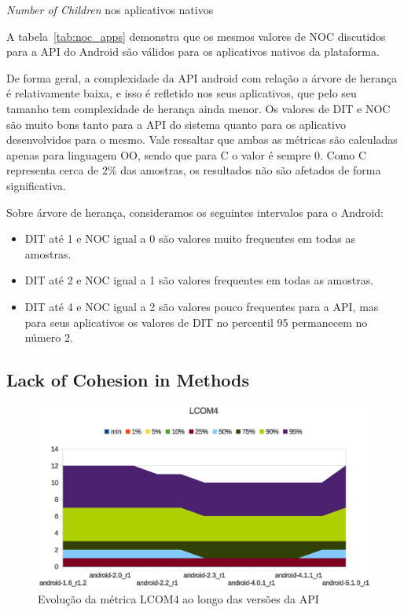 \begin{table}[!htb]
\centering
{}

\caption{\textit{Number of Children} nos aplicativos nativos}
\label{tab:noc_apps}
\end{table}

A tabela~\ref{tab:noc_apps} demonstra que os mesmos valores de NOC discutidos para a API do Android são válidos para os aplicativos nativos da plataforma. 

De forma geral, a complexidade da API android com relação a árvore de herança é relativamente baixa, e isso é refletido nos seus aplicativos, que pelo seu tamanho tem complexidade de herança ainda menor. Os valores de DIT e NOC são muito bons tanto para a API do sistema quanto para os aplicativo desenvolvidos para o mesmo. Vale ressaltar que ambas as métricas são calculadas apenas para linguagem OO, sendo que para C o valor é sempre 0. Como C representa cerca de 2\% das amostras, os resultados não são afetados de forma significativa.

Sobre árvore de herança, consideramos os seguintes intervalos para o Android:

\begin{itemize}
\item DIT até 1 e NOC igual a 0 são valores muito frequentes em todas as amostras.
\item DIT até 2 e NOC igual a 1 são valores frequentes em todas as amostras.
\item DIT até 4 e NOC igual a 2 são valores pouco frequentes para a API, mas para seus aplicativos os valores de DIT no percentil 95 permanecem no número 2.
\end{itemize}

\subsection{Lack of Cohesion in Methods}

\begin{figure}[!htb]
\centering
\includegraphics [keepaspectratio=true,scale=0.85]{figuras/graphs/lcom4_android.eps}
\caption{Evolução da métrica LCOM4 ao longo das versões da API}
\label{fig:lcom4_android}
\end{figure}

